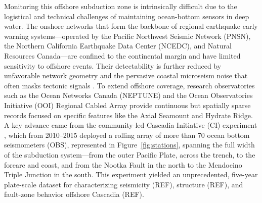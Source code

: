 \documentclass[review]{seismica}
\begin{document}
Monitoring this offshore subduction zone is intrinsically difficult due
to the logistical and technical challenges of maintaining ocean-bottom
sensors in deep water. The onshore networks that form the backbone of
regional earthquake early warning systems---operated by the Pacific
Northwest Seismic Network (PNSN), the Northern California Earthquake
Data Center (NCEDC), and Natural Resources Canada---are confined to the
continental margin and have limited sensitivity to offshore events.
Their detectability is further reduced by unfavorable network geometry
and the pervasive coastal microseism noise that often masks tectonic
signals \citep[e.g.,][]{Webb98}. To extend offshore coverage, research
observatories such as the Ocean Networks Canada (NEPTUNE) and the Ocean
Observatories Initiative (OOI) Regional Cabled Array provide continuous
but spatially sparse records focused on specific features like the Axial
Seamount and Hydrate Ridge. A key advance came from the community-led
Cascadia Initiative (CI) experiment \citep{Toomey14}, which from
2010--2015 deployed a rolling array of more than 70 ocean bottom
seismometers (OBS), represented in Figure~\ref{fig:stations}, spanning
the full width of the subduction system---from the outer Pacific Plate,
across the trench, to the forearc and coast, and from the Nootka Fault
in the north to the Mendocino Triple Junction in the south. This
experiment yielded an unprecedented, five-year plate-scale dataset for
characterizing seismicity (REF), structure (REF), and fault-zone
behavior offshore Cascadia (REF).
\end{document}
